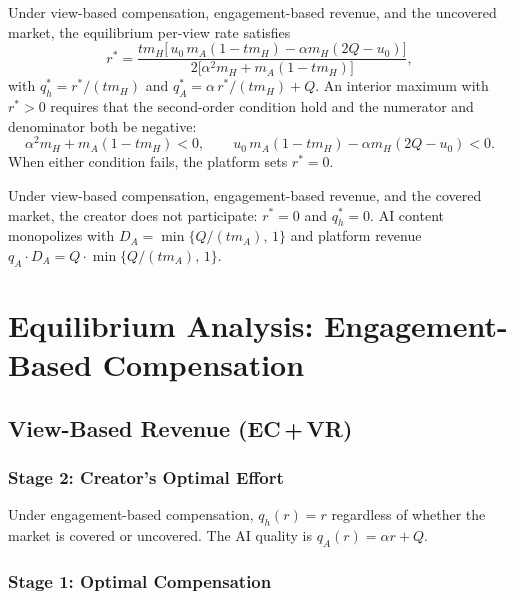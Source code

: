 \documentclass[mnsc,nonblindrev]{informs3_NoOR}
\begin{document}
\begin{proposition}[VC\,+\,ER, Uncovered]\label{prop:VCER-unc}
Under view-based compensation, engagement-based revenue, and the uncovered market, the equilibrium per-view rate satisfies
\begin{equation}\label{eq:rVCER}
r^{*} = \frac{t m_H\bigl[\,u_0\, m_A(1-t m_H) - \alpha m_H(2Q - u_0)\bigr]} {2\bigl[\alpha^2  m_H +  m_A(1-t m_H)\bigr]},
\end{equation}
with $q_h^{*} = r^*/(t m_H)$ and $q_A^{*} = \alpha\, r^*/(t m_H) + Q$.
An interior maximum with $r^* > 0$ requires that the second-order condition hold and the numerator and denominator both be negative:
\[
    \alpha^2 m_H + m_A(1 - t m_H) < 0, \qquad u_0\, m_A(1-t m_H) - \alpha m_H(2Q - u_0) < 0.
\]
When either condition fails, the platform sets $r^* = 0$.
\end{proposition}
 
\begin{proposition}[VC\,+\,ER, Covered]\label{prop:VCER-cov}
Under view-based compensation, engagement-based revenue, and the covered market, the creator does not participate: $r^* = 0$ and $q_h^* = 0$. AI content monopolizes with $D_A = \min\{Q/(tm_A),\, 1\}$ and platform revenue $q_A \cdot D_A = Q \cdot \min\{Q/(tm_A),\, 1\}$.
\end{proposition}
 
 \vfill
 \pagebreak
\section{Equilibrium Analysis: Engagement-Based Compensation}\label{sec:eng}
 
\subsection{View-Based Revenue (EC\,+\,VR)}
 
\subsubsection{Stage 2: Creator's Optimal Effort}
 
Under engagement-based compensation, $q_h(r) = r$ regardless of whether the market is covered or uncovered. The AI quality is $q_A(r) = \alpha r + Q$.
 
\subsubsection{Stage 1: Optimal Compensation}
 
\end{document}
